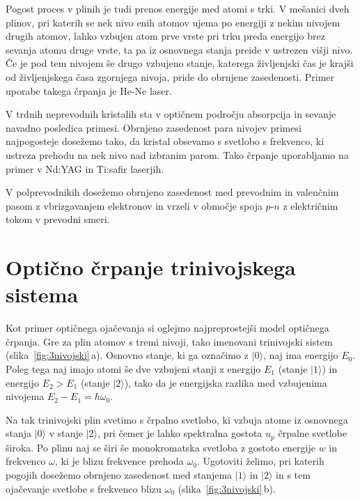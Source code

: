 Pogost proces v plinih je tudi prenos energije med atomi s trki. V
mešanici dveh plinov, pri katerih se nek nivo enih atomov ujema po energiji z
nekim nivojem drugih atomov, lahko vzbujen atom prve vrste pri trku preda 
energijo brez sevanja atomu druge vrste, ta pa iz osnovnega stanja preide v 
ustrezen višji nivo. Če je pod tem nivojem še drugo vzbujeno stanje, katerega
življenjski čas je krajši od življenjskega časa zgornjega nivoja, pride
do obrnjene zasedenosti. Primer uporabe takega črpanja je He-Ne laser.

V trdnih neprevodnih kristalih sta v optičnem področju absorpcija
in sevanje navadno posledica primesi.
Obrnjeno zasedenost para nivojev primesi najpogosteje dosežemo tako, da
kristal obsevamo s svetlobo s frekvenco, ki ustreza prehodu na nek
nivo nad izbranim parom. Tako črpanje uporabljamo na primer v Nd:YAG in Ti:safir 
laserjih.  

V polprevodnikih dosežemo obrnjeno zasedenost med 
prevodnim in valenčnim pasom z vbrizgavanjem elektronov in vrzeli v območje spoja $p$-$n$ 
z električnim tokom v prevodni smeri. 

\section{Optično črpanje trinivojskega sistema}
Kot primer optičnega ojačevanja si oglejmo najpreprostejši model optičnega črpanja.
Gre za plin atomov s tremi nivoji, tako imenovani trinivojski sistem (slika~\ref{fig:3nivojski}\,a).
Osnovno stanje, ki 
ga označimo z $|0\rangle$,  naj ima energijo $E_0$. Poleg tega naj imajo atomi še 
dve vzbujeni stanji z energijo $E_1$ (stanje $|1\rangle$) in energijo $E_2>E_1$
(stanje $|2\rangle$), tako da je energijska razlika med vzbujenima 
nivojema $E_2-E_1 = \hbar \omega_0$.

Na tak trinivojski plin svetimo s črpalno svetlobo, ki vzbuja atome iz osnovnega stanja 
$|0\rangle$ v stanje $|2\rangle$, pri čemer je lahko spektralna gostota $u_{p}$ črpalne 
svetlobe široka. Po plinu naj se širi še monokromatska svetloba z gostoto 
energije $w$ in frekvenco $\omega$, ki je blizu frekvence prehoda $\omega_{0}$. 
Ugotoviti želimo, pri katerih pogojih  dosežemo obrnjeno zasedenost med 
stanjema $|1\rangle$ in $|2\rangle$ in s tem ojačevanje svetlobe s frekvenco blizu
$\omega_{0}$ (slika~\ref{fig:3nivojski}\,b).

